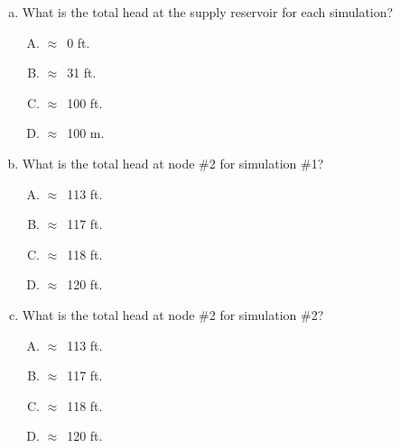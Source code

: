 \documentclass[11pt]{article}
\begin{document}
\begin{enumerate}
\begin{enumerate}[a)]
\item What is the total head at the supply reservoir for each simulation?
\begin{enumerate}[A)]
\item $\approx$~0 ft.
\item $\approx$~31 ft.
\item $\approx$~100 ft.
\item $\approx$~100 m. 
\end{enumerate}

\item What is the total head at node \#2 for simulation \#1?
\begin{enumerate}[A)]
\item $\approx$~113 ft.
\item $\approx$~117 ft.
\item $\approx$~118 ft.
\item $\approx$~120 ft. 
\end{enumerate}

\item What is the total head at node \#2 for simulation \#2?
\begin{enumerate}[A)]
\item $\approx$~113 ft.
\item $\approx$~117 ft.
\item $\approx$~118 ft.
\item $\approx$~120 ft. 
\end{enumerate}


\end{enumerate}
\end{enumerate}
\end{document}
